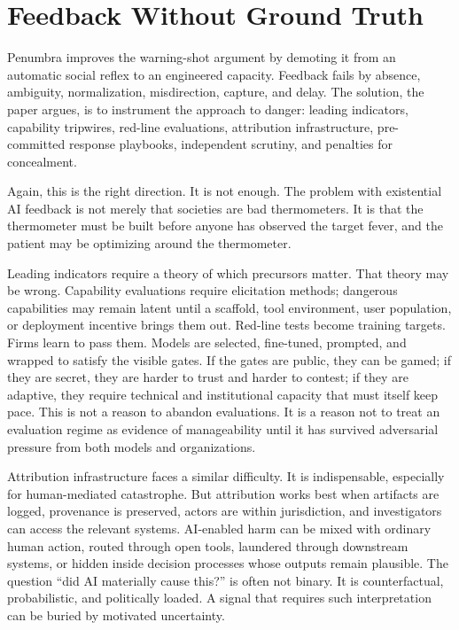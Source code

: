 \documentclass[11pt]{article}
\begin{document}
\section{Feedback Without Ground Truth}
\label{sec:feedback}

Penumbra improves the warning-shot argument by demoting it from an automatic social reflex to an engineered capacity. Feedback fails by absence, ambiguity, normalization, misdirection, capture, and delay. The solution, the paper argues, is to instrument the approach to danger: leading indicators, capability tripwires, red-line evaluations, attribution infrastructure, pre-committed response playbooks, independent scrutiny, and penalties for concealment.

Again, this is the right direction. It is not enough. The problem with existential AI feedback is not merely that societies are bad thermometers. It is that the thermometer must be built before anyone has observed the target fever, and the patient may be optimizing around the thermometer.

Leading indicators require a theory of which precursors matter. That theory may be wrong. Capability evaluations require elicitation methods; dangerous capabilities may remain latent until a scaffold, tool environment, user population, or deployment incentive brings them out. Red-line tests become training targets. Firms learn to pass them. Models are selected, fine-tuned, prompted, and wrapped to satisfy the visible gates. If the gates are public, they can be gamed; if they are secret, they are harder to trust and harder to contest; if they are adaptive, they require technical and institutional capacity that must itself keep pace. This is not a reason to abandon evaluations. It is a reason not to treat an evaluation regime as evidence of manageability until it has survived adversarial pressure from both models and organizations.

Attribution infrastructure faces a similar difficulty. It is indispensable, especially for human-mediated catastrophe. But attribution works best when artifacts are logged, provenance is preserved, actors are within jurisdiction, and investigators can access the relevant systems. AI-enabled harm can be mixed with ordinary human action, routed through open tools, laundered through downstream systems, or hidden inside decision processes whose outputs remain plausible. The question ``did AI materially cause this?'' is often not binary. It is counterfactual, probabilistic, and politically loaded. A signal that requires such interpretation can be buried by motivated uncertainty.
\end{document}
